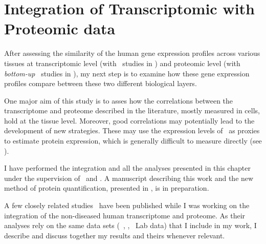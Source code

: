 \chapter{Integration of Transcriptomic with Proteomic data}\label{ch:Integration}
\setlength{\epigraphwidth}{0.8\textwidth}
\setlength{\epigraphrule}{0pt}

\vspace{2cm}
After assessing the similarity of the human gene expression profiles
across various tissues
at transcriptomic level (with \Rnaseq\ studies in )
and proteomic level (with \emph{bottom-up} \ms\ studies in ),
my next step is to examine how these gene expression profiles
compare between these two different biological layers.\mybr\

One major aim of this study is to asses
how the correlations between the transcriptome and proteome
described in the literature, mostly measured in cells,
hold at the tissue level.
Moreover, good correlations may potentially lead to
the development of new strategies.
These may use the expression levels of \mRNA\ as proxies
to estimate protein expression,
which is generally difficult to measure directly (see ).\mybr\

I have performed the integration and all the analyses presented in this chapter
under the supervision of \alvis\ and \jyoti.
A manuscript describing this work
and the new method of protein quantification, presented in ,
is in preparation.\mybr\

A few closely related studies~ have
been published while I was working on
the integration of the non-diseased human transcriptome and proteome.
As their analyses rely on the same data sets (\ie\ \uhlen, \gtex, \pandey\ Lab data)
that I include in my work,
I describe and discuss together my results and theirs
whenever relevant.\mybr\

